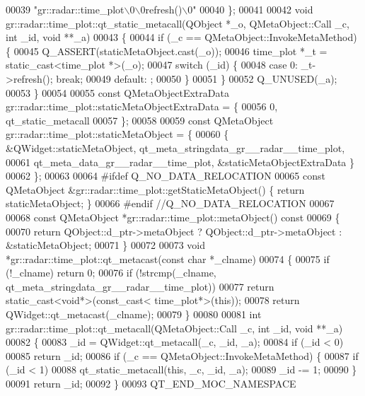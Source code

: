 \begin{DoxyCode}
00039     \textcolor{stringliteral}{"gr::radar::time\_plot\(\backslash\)0\(\backslash\)0refresh()\(\backslash\)0"}
00040 \};
00041 
00042 \textcolor{keywordtype}{void} gr::radar::time\_plot::qt\_static\_metacall(QObject *\_o, QMetaObject::Call \_c, \textcolor{keywordtype}{int} \_id, \textcolor{keywordtype}{void} **\_a)
00043 \{
00044     \textcolor{keywordflow}{if} (\_c == QMetaObject::InvokeMetaMethod) \{
00045         Q\_ASSERT(staticMetaObject.cast(\_o));
00046         time_plot *\_t = \textcolor{keyword}{static\_cast<}time_plot *\textcolor{keyword}{>}(\_o);
00047         \textcolor{keywordflow}{switch} (\_id) \{
00048         \textcolor{keywordflow}{case} 0: \_t->refresh(); \textcolor{keywordflow}{break};
00049         \textcolor{keywordflow}{default}: ;
00050         \}
00051     \}
00052     Q\_UNUSED(\_a);
00053 \}
00054 
00055 \textcolor{keyword}{const} QMetaObjectExtraData gr::radar::time\_plot::staticMetaObjectExtraData = \{
00056     0,  qt\_static\_metacall 
00057 \};
00058 
00059 \textcolor{keyword}{const} QMetaObject gr::radar::time\_plot::staticMetaObject = \{
00060     \{ &QWidget::staticMetaObject, qt_meta_stringdata_gr__radar__time_plot,
00061       qt_meta_data_gr__radar__time_plot, &staticMetaObjectExtraData \}
00062 \};
00063 
00064 \textcolor{preprocessor}{#ifdef Q\_NO\_DATA\_RELOCATION}
00065 \textcolor{keyword}{const} QMetaObject &gr::radar::time\_plot::getStaticMetaObject() \{ \textcolor{keywordflow}{return} staticMetaObject; \}
00066 \textcolor{preprocessor}{#endif //Q\_NO\_DATA\_RELOCATION}
00067 
00068 \textcolor{keyword}{const} QMetaObject *gr::radar::time\_plot::metaObject()\textcolor{keyword}{ const}
00069 \textcolor{keyword}{}\{
00070     \textcolor{keywordflow}{return} QObject::d\_ptr->metaObject ? QObject::d\_ptr->metaObject : &staticMetaObject;
00071 \}
00072 
00073 \textcolor{keywordtype}{void} *gr::radar::time\_plot::qt\_metacast(\textcolor{keyword}{const} \textcolor{keywordtype}{char} *\_clname)
00074 \{
00075     \textcolor{keywordflow}{if} (!\_clname) \textcolor{keywordflow}{return} 0;
00076     \textcolor{keywordflow}{if} (!strcmp(\_clname, qt_meta_stringdata_gr__radar__time_plot))
00077         \textcolor{keywordflow}{return} \textcolor{keyword}{static\_cast<}\textcolor{keywordtype}{void}*\textcolor{keyword}{>}(\textcolor{keyword}{const\_cast<} time_plot*\textcolor{keyword}{>}(\textcolor{keyword}{this}));
00078     \textcolor{keywordflow}{return} QWidget::qt\_metacast(\_clname);
00079 \}
00080 
00081 \textcolor{keywordtype}{int} gr::radar::time\_plot::qt\_metacall(QMetaObject::Call \_c, \textcolor{keywordtype}{int} \_id, \textcolor{keywordtype}{void} **\_a)
00082 \{
00083     \_id = QWidget::qt\_metacall(\_c, \_id, \_a);
00084     \textcolor{keywordflow}{if} (\_id < 0)
00085         \textcolor{keywordflow}{return} \_id;
00086     \textcolor{keywordflow}{if} (\_c == QMetaObject::InvokeMetaMethod) \{
00087         \textcolor{keywordflow}{if} (\_id < 1)
00088             qt\_static\_metacall(\textcolor{keyword}{this}, \_c, \_id, \_a);
00089         \_id -= 1;
00090     \}
00091     \textcolor{keywordflow}{return} \_id;
00092 \}
00093 QT\_END\_MOC\_NAMESPACE
\end{DoxyCode}
